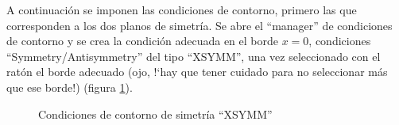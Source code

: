 \documentclass[spanish,a4paper,12pt]{article}
\begin{document}
A continuación se imponen las condiciones de contorno, primero las que corresponden a los dos planos de simetría.
Se abre el ``manager'' de condiciones de contorno y se crea la condición adecuada en el borde $x=0$, condiciones ``Symmetry/Antisymmetry'' del tipo ``XSYMM'', una vez seleccionado con el ratón el borde adecuado (ojo, !`hay que tener cuidado para no seleccionar más que ese borde!)
(figura \ref{fig:xsymm}).
\begin{figure}[h!tp]
\centering
{}
\caption{Condiciones de contorno de simetría ``XSYMM''}
\label{fig:xsymm}
\end{figure}
\end{document}
